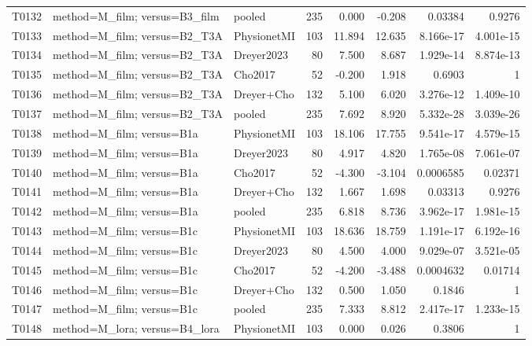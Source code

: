 \begin{longtable}{p{.45in}p{2.6in}p{.75in}rrrrr}
T0132 & method=M\_\allowbreak{}film; versus=B3\_\allowbreak{}film & pooled & 235 & 0.000 & -0.208 & 0.03384 & 0.9276 \\
T0133 & method=M\_\allowbreak{}film; versus=B2\_\allowbreak{}T3A & PhysionetMI & 103 & 11.894 & 12.635 & 8.166e-17 & 4.001e-15 \\
T0134 & method=M\_\allowbreak{}film; versus=B2\_\allowbreak{}T3A & Dreyer2023 & 80 & 7.500 & 8.687 & 1.929e-14 & 8.874e-13 \\
T0135 & method=M\_\allowbreak{}film; versus=B2\_\allowbreak{}T3A & Cho2017 & 52 & -0.200 & 1.918 & 0.6903 & 1 \\
T0136 & method=M\_\allowbreak{}film; versus=B2\_\allowbreak{}T3A & Dreyer+Cho & 132 & 5.100 & 6.020 & 3.276e-12 & 1.409e-10 \\
T0137 & method=M\_\allowbreak{}film; versus=B2\_\allowbreak{}T3A & pooled & 235 & 7.692 & 8.920 & 5.332e-28 & 3.039e-26 \\
T0138 & method=M\_\allowbreak{}film; versus=B1a & PhysionetMI & 103 & 18.106 & 17.755 & 9.541e-17 & 4.579e-15 \\
T0139 & method=M\_\allowbreak{}film; versus=B1a & Dreyer2023 & 80 & 4.917 & 4.820 & 1.765e-08 & 7.061e-07 \\
T0140 & method=M\_\allowbreak{}film; versus=B1a & Cho2017 & 52 & -4.300 & -3.104 & 0.0006585 & 0.02371 \\
T0141 & method=M\_\allowbreak{}film; versus=B1a & Dreyer+Cho & 132 & 1.667 & 1.698 & 0.03313 & 0.9276 \\
T0142 & method=M\_\allowbreak{}film; versus=B1a & pooled & 235 & 6.818 & 8.736 & 3.962e-17 & 1.981e-15 \\
T0143 & method=M\_\allowbreak{}film; versus=B1c & PhysionetMI & 103 & 18.636 & 18.759 & 1.191e-17 & 6.192e-16 \\
T0144 & method=M\_\allowbreak{}film; versus=B1c & Dreyer2023 & 80 & 4.500 & 4.000 & 9.029e-07 & 3.521e-05 \\
T0145 & method=M\_\allowbreak{}film; versus=B1c & Cho2017 & 52 & -4.200 & -3.488 & 0.0004632 & 0.01714 \\
T0146 & method=M\_\allowbreak{}film; versus=B1c & Dreyer+Cho & 132 & 0.500 & 1.050 & 0.1846 & 1 \\
T0147 & method=M\_\allowbreak{}film; versus=B1c & pooled & 235 & 7.333 & 8.812 & 2.417e-17 & 1.233e-15 \\
T0148 & method=M\_\allowbreak{}lora; versus=B4\_\allowbreak{}lora & PhysionetMI & 103 & 0.000 & 0.026 & 0.3806 & 1 \\

\end{longtable}
